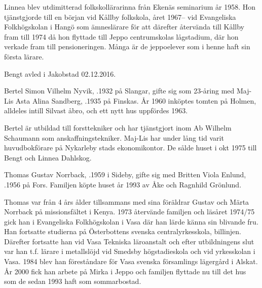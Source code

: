 Linnea blev utdimitterad folkskollärarinna från Ekenäs seminarium år 1958. Hon tjänstgjorde till en början vid Kållby folkskola, året 1967-- vid Evangeliska Folkhögskolan i Hangö som ämneslärare för att därefter återvända till Kållby fram till 1974 då hon flyttade till Jeppo centrumskolas lågstadium, där hon verkade fram till pensioneringen. Många är de jeppoelever som i henne haft sin första lärare.
\begin{jhchildren}
  \item {}
  \item {}
  \item {}
\end{jhchildren}

Bengt avled i Jakobstad 02.12.2016.


%
Bertel Simon Vilhelm Nyvik, .1932 på Slangar, gifte sig som 23-åring med Maj-Lis Asta Alina Sandberg, .1935 på Finskas. År 1960 inköptes tomten på Holmen, alldeles intill Silvast åbro, och ett nytt hus uppfördes 1963.

Bertel är utbildad till forsttekniker och har tjänstgjort inom Ab Wilhelm Schaumann som anskaffningstekniker. Maj-Lis har under lång tid varit huvudbokförare på Nykarleby stads ekonomikontor. De sålde huset i okt 1975 till Bengt och Linnea Dahlskog.



%



%
Thomas Gustav Norrback, .1959 i Sideby, gifte sig med Britten Viola Enlund, .1956 på Fors. Familjen köpte huset år 1993  av Åke och Ragnhild Grönlund.

Thomas var från 4 års ålder tillsammans med sina föräldrar Gustav och Märta Norrback på missionsfältet i Kenya. 1973 återvände familjen och läsåret 1974/75 gick han i Evangeliska Folkhögskolan i Vasa där han lärde känna sin blivande fru. Han fortsatte studierna på Österbottens svenska centralyrkesskola, billinjen. Därefter fortsatte han vid Vasa Tekniska läroanstalt och efter utbildningens slut var han t.f. lärare i metallslöjd vid Smedsby högstadieskola och vid yrkesskolan i Vasa. 1984 blev han föreståndare för Vasa svenska församlings lägergård i Alskat. År 2000 fick han arbete på Mirka i Jeppo och familjen flyttade nu till det hus som de sedan 1993 haft som sommarbostad.

